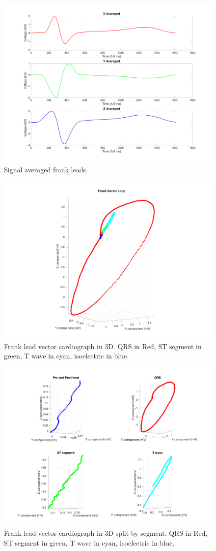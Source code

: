 \documentclass[12pt]{article}
\begin{document}
\begin{figure}[H]
	
	\centering
	\includegraphics[width = .8\textwidth]{Figures/FrankLeads3.png}
	\caption{Signal averaged frank leads.}
	\label{fig:Frank3}
\end{figure}

\begin{figure}[H]
	
	\centering
	\includegraphics[width = .7\textwidth]{Figures/FrankLeads_3d.png}
	\caption{Frank lead vector cardiograph in 3D. QRS in Red, ST segment in green, T wave in cyan, isoelectric in blue.}
	\label{fig:Frank3D}
\end{figure}

\begin{figure}[H]
	
	\centering
	\includegraphics[width = .75\textwidth]{Figures/FrankLeads_3d_split.png}
	\caption{Frank lead vector cardiograph in 3D split by segment. QRS in Red, ST segment in green, T wave in cyan, isoelectric in blue.}
	\label{fig:Frank3D_split}
\end{figure}
\end{document}
